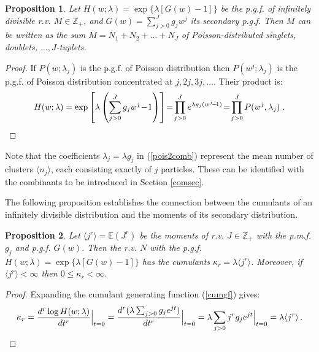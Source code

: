 \documentclass[a4paper,12pt]{amsart}
\newcommand{\E}{\mathbb{E}}
\newcommand{\Z}{\mathbb{Z}_{+}}
\newtheorem{Proposition}{Proposition}[section]
\theoremstyle{definition}
\theoremstyle{remark}
\begin{document}
\begin{Proposition} {\rm \cite{Feller1}}
\label{Pmultiplets}
Let $H(w;\lambda)=\exp\{\lambda [G(w)\!-\!1]\}$ be the p.g.f. of  infinitely divisible r.v. $M\in \mathbb{Z}_+$, and $G(w)=\sum_{j>0}^{J}g_j w^j$ its secondary p.g.f. Then $M$ can be written as the sum $M \!= \!N_1\!+ \! N_2 \!+\! \ldots \!+\! N_J$ of 
Poisson-distributed singlets, doublets, $\ldots, J$-tuplets. 
\end{Proposition}
\begin{proof}
If $P(w;\lambda_j)$ is the p.g.f. of Poisson distribution then $P(w^j;\lambda_j)$ is the p.g.f. of Poisson distribution concentrated at $j,2j,3j,\ldots$. Their product is:
\begin{equation}  \label{pois2comb}
 H(w;\lambda)=\exp\left[\lambda \left(\sum_{j>0}^{J}g_j w^j\!-\!1\right)\right] \!=\!\prod_{j>0}^{J}e^{\lambda g_j (w^j \!-\!1)}\! =\! 
 \prod_{j>0}^{J}P(w^j,\lambda_j) \;. 
\vspace{-.6cm}
\end{equation}
\end{proof}

Note that the coefficients $\lambda_j=\lambda g_j$ in (\ref{pois2comb}) represent the mean number of clusters $\langle n_j \rangle$, each consisting exactly of  $j$ particles. These can be identified with the combinants to be introduced in Section \ref{comsec}.  

The following proposition establishes the connection between the cumulants of an infinitely divisible distribution and the moments of its secondary distribution.

\begin{Proposition}\label{CPDcum}
Let $\langle j^r \rangle=\E(J^r)$ be the moments of r.v. $J\in \Z $ with the p.m.f. $g_j$ and p.g.f. $G(w)$. Then the r.v. $N$ with the p.g.f. $H(w;\lambda)=\exp\{\lambda[G(w)-1]\}$ has the cumulants $\kappa_r=\lambda \langle j^r \rangle$. Moreover, if $\langle j^r \rangle<\infty$ then $0\leq \kappa_r<\infty$.
\end{Proposition}
 \begin{proof}
Expanding the cumulant generating function (\ref{cumgf}) gives:
\begin{equation}
 \kappa_r=\frac{d^r \log H(w;\lambda)}{dt^r}\Big |_{t=0} =\frac{d^r (\lambda \sum_{j>0}g_j e^{jt})}{dt^r}\Big |_{t=0}=  \lambda \sum_{j>0}j^r g_j e^{jt}\Big |_{t=0}
 = \lambda \langle j^r \rangle \,.
\vspace{-.8cm}
\label{infdcum}
\end{equation}        
\end{proof}
\end{document}
